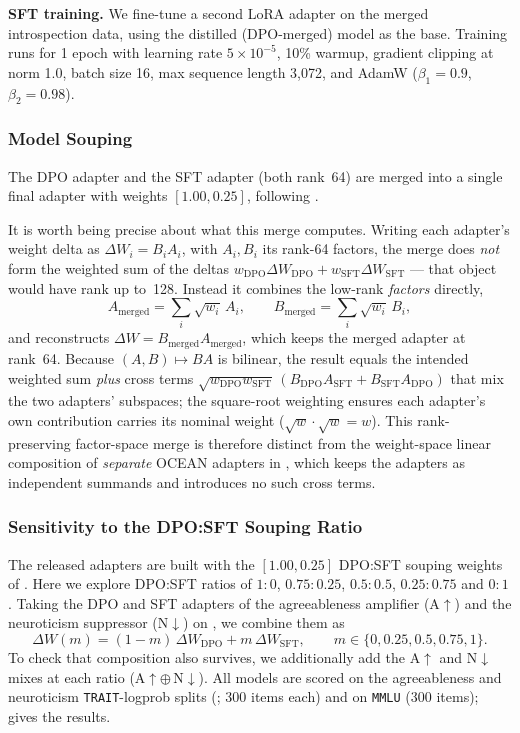 \textbf{SFT training.} We fine-tune a second LoRA adapter on the merged introspection data, using the distilled (DPO-merged) model as the base. Training runs for 1 epoch with learning rate $5 \times 10^{-5}$, 10\% warmup, gradient clipping at norm 1.0, batch size 16, max sequence length 3,072, and AdamW ($\beta_1 = 0.9$, $\beta_2 = 0.98$).

\subsubsection{Model Souping}\label{sec:model-souping}

The DPO adapter and the SFT adapter (both rank~64) are merged into a single
final adapter with weights $[1.00, 0.25]$, following \citet{maiya2025opencharacter}.

It is worth being precise about what this merge computes. Writing each adapter's weight delta as $\Delta W_i = B_i A_i$, with
$A_i, B_i$ its rank-64 factors, the merge does \emph{not} form the weighted sum
of the deltas $w_{\text{DPO}}\Delta W_{\text{DPO}} + w_{\text{SFT}}\Delta W_{\text{SFT}}$
--- that object would have rank up to~128. Instead it combines the low-rank
\emph{factors} directly,
\[
A_{\text{merged}} = \sum_i \sqrt{w_i}\, A_i, \qquad
B_{\text{merged}} = \sum_i \sqrt{w_i}\, B_i,
\]
and reconstructs $\Delta W = B_{\text{merged}} A_{\text{merged}}$, which keeps
the merged adapter at rank~64. Because $(A, B) \mapsto BA$ is bilinear, the
result equals the intended weighted sum \emph{plus} cross terms
$\sqrt{w_{\text{DPO}} w_{\text{SFT}}}\,(B_{\text{DPO}} A_{\text{SFT}} + B_{\text{SFT}} A_{\text{DPO}})$
that mix the two adapters' subspaces; the square-root weighting ensures each
adapter's own contribution carries its nominal weight ($\sqrt{w}\cdot\sqrt{w} = w$).
This rank-preserving factor-space merge is therefore distinct from the
weight-space linear composition of \emph{separate} OCEAN adapters in
, which keeps the adapters as independent summands
and introduces no such cross terms.

\subsubsection{Sensitivity to the DPO:SFT Souping Ratio}\label{sec:appendix-soup-ratio}

The released adapters are built with the $[1.00, 0.25]$ DPO:SFT souping
weights of \citet{maiya2025opencharacter}. Here we
explore DPO:SFT ratios of $1{:}0$, $0.75{:}0.25$, $0.5{:}0.5$, $0.25{:}0.75$
and $0{:}1$. Taking the DPO and SFT adapters of the agreeableness amplifier
(A$\uparrow$) and the neuroticism suppressor (N$\downarrow$) on
\LlamaThreePointOneSizeEightBInstruct, we combine them as
\[
\Delta W(m) = (1-m)\,\Delta W_{\text{DPO}} + m\,\Delta W_{\text{SFT}},
\qquad m \in \{0, 0.25, 0.5, 0.75, 1\}.
\]
To check that composition also survives, we additionally add the A$\uparrow$ and N$\downarrow$ mixes at
each ratio (A$\uparrow \oplus\,$N$\downarrow$). All models are scored on the
agreeableness and neuroticism \texttt{TRAIT}-logprob splits
(; 300 items each) and on \texttt{MMLU} (300 items);
 gives the results.

